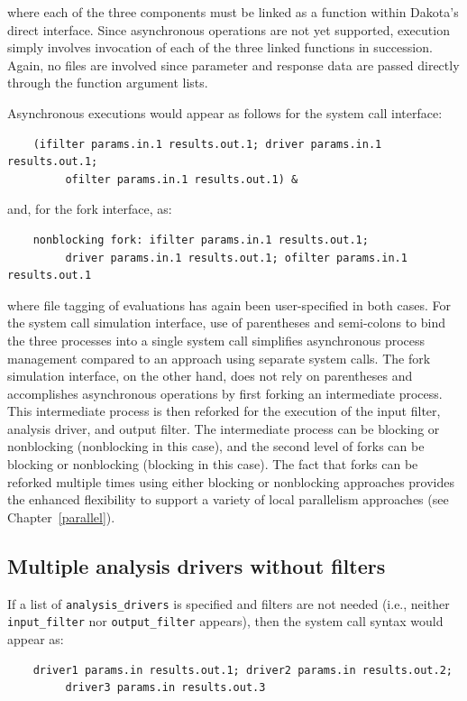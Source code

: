 where each of the three components must be linked as a function within
Dakota's direct interface. Since asynchronous operations are not yet
supported, execution simply involves invocation of each of the three
linked functions in succession. Again, no files are involved since
parameter and response data are passed directly through the function
argument lists.

Asynchronous executions would appear as follows for the system call
interface:
\begin{small}
\begin{verbatim}
    (ifilter params.in.1 results.out.1; driver params.in.1 results.out.1;
         ofilter params.in.1 results.out.1) &
\end{verbatim}
\end{small}

and, for the fork interface, as:
\begin{small}
\begin{verbatim}
    nonblocking fork: ifilter params.in.1 results.out.1;
         driver params.in.1 results.out.1; ofilter params.in.1 results.out.1
\end{verbatim}
\end{small}

where file tagging of evaluations has again been user-specified in
both cases. For the system call simulation interface, use of
parentheses and semi-colons to bind the three processes into a single
system call simplifies asynchronous process management compared to an
approach using separate system calls. The fork simulation interface,
on the other hand, does not rely on parentheses and accomplishes
asynchronous operations by first forking an intermediate process. This
intermediate process is then reforked for the execution of the input
filter, analysis driver, and output filter. The intermediate process
can be blocking or nonblocking (nonblocking in this case), and the
second level of forks can be blocking or nonblocking (blocking in this
case). The fact that forks can be reforked multiple times using either
blocking or nonblocking approaches provides the enhanced flexibility
to support a variety of local parallelism approaches (see
Chapter~\ref{parallel}).

\subsection{Multiple analysis drivers without filters}\label{interfaces:components:multiple1}

If a list of \texttt{analysis\_drivers} is specified and filters are
not needed (i.e., neither \texttt{input\_filter} nor
\texttt{output\_filter} appears), then the system call syntax
would appear as:
\begin{small}
\begin{verbatim}
    driver1 params.in results.out.1; driver2 params.in results.out.2;
         driver3 params.in results.out.3
\end{verbatim}
\end{small}

